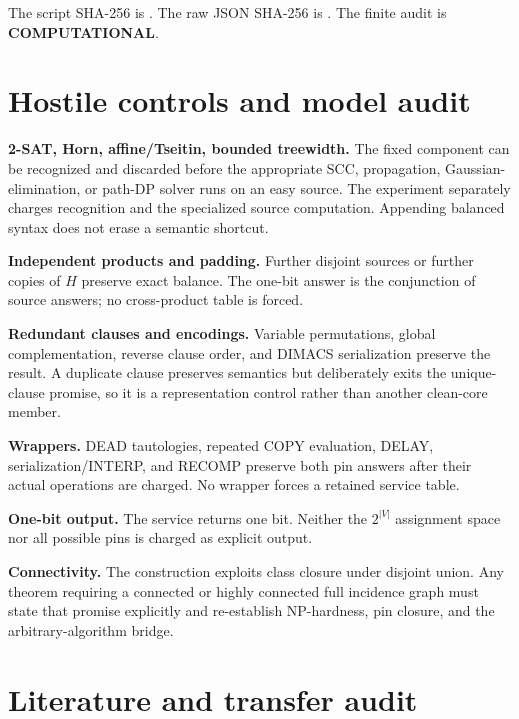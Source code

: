 \documentclass[11pt]{article}
\newcommand{\COMP}{\textbf{COMPUTATIONAL}}
\begin{document}
The script SHA-256 is
.
The raw JSON SHA-256 is
.
The finite audit is \COMP.

\section{Hostile controls and model audit}

\begin{description}[leftmargin=0cm,labelwidth=0cm]
\item[] \textbf{2-SAT, Horn, affine/Tseitin, bounded treewidth.}
The fixed component can be recognized and discarded before the appropriate
SCC, propagation, Gaussian-elimination, or path-DP solver runs on an easy
source.  The experiment separately charges recognition and the specialized
source computation.  Appending balanced syntax does not erase a semantic
shortcut.
\item[] \textbf{Independent products and padding.}
Further disjoint sources or further copies of $H$ preserve exact balance.
The one-bit answer is the conjunction of source answers; no cross-product
table is forced.
\item[] \textbf{Redundant clauses and encodings.}
Variable permutations, global complementation, reverse clause order, and
DIMACS serialization preserve the result.  A duplicate clause preserves
semantics but deliberately exits the unique-clause promise, so it is a
representation control rather than another clean-core member.
\item[] \textbf{Wrappers.}
DEAD tautologies, repeated COPY evaluation, DELAY, serialization/INTERP, and
RECOMP preserve both pin answers after their actual operations are charged.
No wrapper forces a retained service table.
\item[] \textbf{One-bit output.}
The service returns one bit.  Neither the $2^{|V|}$ assignment space nor all
possible pins is charged as explicit output.
\item[] \textbf{Connectivity.}
The construction exploits class closure under disjoint union.  Any theorem
requiring a connected or highly connected full incidence graph must state
that promise explicitly and re-establish NP-hardness, pin closure, and the
arbitrary-algorithm bridge.
\end{description}

\section{Literature and transfer audit}
\end{document}
